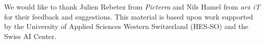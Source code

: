 \documentclass[sigconf]{acmart}
\begin{document}
\begin{acks}

We would like to thank Julien Rebetez from \textit{Picterra} and Nils Hamel from \textit{arx iT} for their feedback and suggestions.
This material is based upon work supported by the University of Applied Sciences Western Switzerland (HES-SO) and the Swiss AI Center.

\end{acks}



\end{document}
